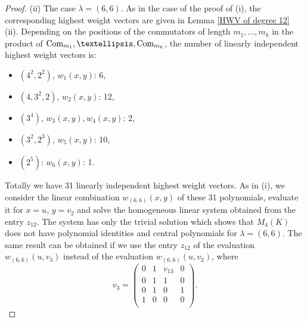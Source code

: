 \documentclass[10pt,a4paper]{amsart}
\begin{document}
\begin{proof}
(ii) The case $\lambda=(6,6)$. As in the case of the proof of (i), the corresponding highest weight vectors are given in Lemma \ref{HWV of degree 12} (ii).
Depending on the positions of the commutators of length $m_1,\ldots,m_k$ in the product of $\text{\rm Com}_{m_1},\ldots,\text{\rm Com}_{m_k}$,
the number of linearly independent highest weight vectors is:
\begin{itemize}
\item $(4^2,2^2)$, $w_1(x,y)$: 6,
\item $(4,3^2,2)$, $w_2(x,y)$: 12,
\item $(3^4)$, $w_3(x,y),w_4(x,y)$: 2,
\item $(3^2,2^3)$, $w_5(x,y)$: 10,
\item $(2^5)$: $w_6(x,y)$: 1.
\end{itemize}
Totally we have 31 linearly independent highest weight vectors. As in (i), we consider the linear combination $w_{(6,6)}(x,y)$ of these 31 polynomials,
evaluate it for $x=u$, $y=v_2$ and solve the homogeneous linear system obtained from the entry $z_{12}$. The system has only the trivial solution which shows
that $M_4(K)$ does not have polynomial identities and central polynomials for $\lambda=(6,6)$.
The same result can be obtained if we use the entry $z_{12}$ of the evaluation $w_{(6,6)}(u,v_3)$ instead of the evaluation $w_{(6,6)}(u,v_2)$, where
\[
v_3=\left(\begin{matrix}0&1&v_{13}&0\\
0&1&1&0\\
0&1&0&1\\
1&0&0&0\\
\end{matrix}\right).
\]
\end{proof}
\end{document}
